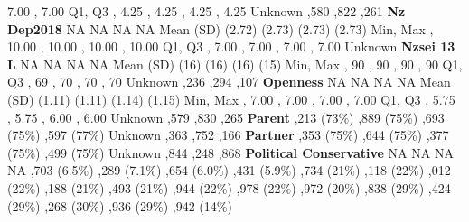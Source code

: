 \documentclass[
  single column]{article}
\begin{document}
\begin{table}
{7.00 , 7.00 \textbar{} \textbar Q1, Q3 , 4.25
, 4.25 , 4.25 , 4.25 \textbar{}
\textbar Unknown  ,580 ,822 ,261
\textbar{} \textbar{}\textbf{Nz Dep2018} \textbar NA \textbar NA
\textbar NA \textbar NA \textbar{} \textbar Mean (SD) 
(2.72)  (2.73)  (2.73)  (2.73)
\textbar{} \textbar Min, Max , 10.00 , 10.00
, 10.00 , 10.00 \textbar{} \textbar Q1, Q3
, 7.00 , 7.00 , 7.00 ,
7.00 \textbar{} \textbar Unknown   
 \textbar{} \textbar{}\textbf{Nzsei 13 L} \textbar NA
\textbar NA \textbar NA \textbar NA \textbar{} \textbar Mean (SD)
 (16)  (16)  (16)  (15)
\textbar{} \textbar Min, Max , 90 , 90 ,
90 , 90 \textbar{} \textbar Q1, Q3 , 69 ,
70 , 70 , 70 \textbar{} \textbar Unknown 
,236 ,294 ,107 \textbar{}
\textbar{}\textbf{Openness} \textbar NA \textbar NA \textbar NA
\textbar NA \textbar{} \textbar Mean (SD)  (1.11)
 (1.11)  (1.14)  (1.15) \textbar{}
\textbar Min, Max , 7.00 , 7.00 ,
7.00 , 7.00 \textbar{} \textbar Q1, Q3 , 5.75
, 5.75 , 6.00 , 6.00 \textbar{}
\textbar Unknown  ,579 ,830 ,265
\textbar{} \textbar{}\textbf{Parent} ,213 (73\%)
,889 (75\%) ,693 (75\%) ,597 (77\%)
\textbar{} \textbar Unknown  ,363 ,752
,166 \textbar{} \textbar{}\textbf{Partner} ,353
(75\%) ,644 (75\%) ,377 (75\%) ,499 (75\%)
\textbar{} \textbar Unknown  ,844 ,248
,868 \textbar{} \textbar{}\textbf{Political Conservative}
\textbar NA \textbar NA \textbar NA \textbar NA \textbar{} 
,703 (6.5\%) ,289 (7.1\%) ,654 (6.0\%)
,431 (5.9\%) \textbar{}  ,734 (21\%)
,118 (22\%) ,012 (22\%) ,188 (21\%)
\textbar{}  ,493 (21\%) ,944 (22\%)
,978 (22\%) ,972 (20\%) \textbar{} 
,838 (29\%) ,424 (29\%) ,268 (30\%)
,936 (29\%) \textbar{}  ,942 (14\%)
}
\end{table}
\end{document}

